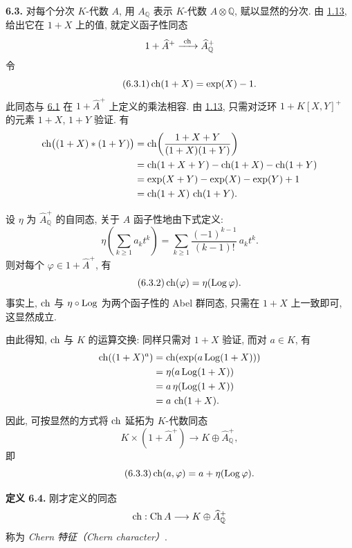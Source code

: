 \textbf{6.3.} 对每个分次 \(K\)-代数 \(A\), 用 \(A_{\mathbb Q}\) 表示 \(K\)-代数 \(A\otimes\mathbb Q\), 赋以显然的分次. 由 \hyperlink{sga6.e05.thm.1-13}{1.13}, 给出它在 \(1+X\) 上的值, 就定义函子性同态
\[
  1+\widehat A^+\xrightarrow{\ \operatorname{ch}\ }\widehat A_{\mathbb Q}^{+}
\]
令
\begin{equation}\tag{6.3.1}
  \operatorname{ch}(1+X)=\exp(X)-1.
\end{equation}
此同态与 \hyperlink{sga6.e05.para.6-1}{6.1} 在 \(1+\widehat A^+\) 上定义的乘法相容. 由 \hyperlink{sga6.e05.thm.1-13}{1.13}, 只需对泛环 \(1+K[X,Y]^+\) 的元素 \(1+X\), \(1+Y\) 验证. 有
\[
\begin{aligned}
 \operatorname{ch}\bigl((1+X)*(1+Y)\bigr)
 &= \operatorname{ch}\!\left(\frac{1+X+Y}{(1+X)(1+Y)}\right)\\
 &= \operatorname{ch}(1+X+Y)-\operatorname{ch}(1+X)-\operatorname{ch}(1+Y)\\
 &= \exp(X+Y)-\exp(X)-\exp(Y)+1\\
 &= \operatorname{ch}(1+X)\,\operatorname{ch}(1+Y).
\end{aligned}
\]

设 \(\eta\) 为 \(\widehat A_{\mathbb Q}^{+}\) 的自同态, 关于 \(A\) 函子性地由下式定义:
\[
 \eta\!\left(\sum_{k\ge1} a_k t^k\right)
 =
 \sum_{k\ge1}\frac{(-1)^{k-1}}{(k-1)!}\,a_k t^k.
\]
则对每个 \(\varphi\in1+\widehat A^+\), 有
\begin{equation}\tag{6.3.2}
  \operatorname{ch}(\varphi)=\eta(\operatorname{Log}\varphi).
\end{equation}
事实上, \(\operatorname{ch}\) 与 \(\eta\circ\operatorname{Log}\) 为两个函子性的 Abel 群同态, 只需在 \(1+X\) 上一致即可, 这显然成立.

由此得知, \(\operatorname{ch}\) 与 \(K\) 的运算交换: 同样只需对 \(1+X\) 验证, 而对 \(a\in K\), 有
\[
\begin{aligned}
 \operatorname{ch}((1+X)^a)
 &=\operatorname{ch}(\exp(a\operatorname{Log}(1+X)))\\
 &=\eta(a\operatorname{Log}(1+X))\\
 &=a\,\eta(\operatorname{Log}(1+X))\\
 &=a\,\operatorname{ch}(1+X).
\end{aligned}
\]
因此, 可按显然的方式将 \(\operatorname{ch}\) 延拓为 \(K\)-代数同态
\[
  K\times(1+\widehat A^+)\longrightarrow K\oplus\widehat A_{\mathbb Q}^{+},
\]
即
\begin{equation}\tag{6.3.3}
  \operatorname{ch}(a,\varphi)=a+\eta(\operatorname{Log}\varphi).
\end{equation}

\textbf{定义 6.4.} 刚才定义的同态
\[
  \operatorname{ch}:\operatorname{Ch} A\longrightarrow K\oplus\widehat A_{\mathbb Q}^{+}
\]
称为 \emph{Chern 特征（Chern character）}.

